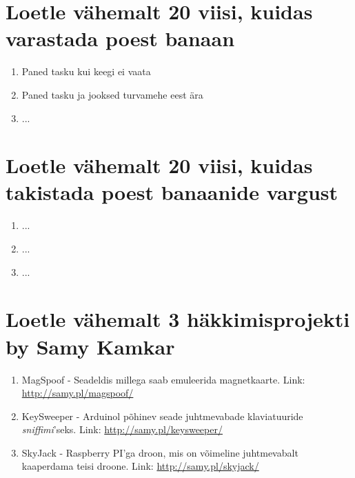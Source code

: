 \documentclass{article}
\begin{document}
\section{Loetle vähemalt 20 viisi, kuidas varastada poest banaan}
\begin{enumerate}
	\item{Paned tasku kui keegi ei vaata}
	\item{Paned tasku ja jooksed turvamehe eest ära}
	\item{...}
\end{enumerate}

\section{Loetle vähemalt 20 viisi, kuidas takistada poest banaanide vargust}
\begin{enumerate}
	\item{...}
	\item{...}
	\item{...}
\end{enumerate}

\section{Loetle vähemalt 3 häkkimisprojekti by Samy Kamkar}
\begin{enumerate}
	\item{MagSpoof - Seadeldis millega saab emuleerida magnetkaarte. Link: \url{http://samy.pl/magspoof/}}
	\item{KeySweeper - Arduinol põhinev seade juhtmevabade klaviatuuride \textit{sniffimi}'seks. Link: \url{http://samy.pl/keysweeper/}}
	\item{SkyJack - Raspberry PI'ga droon, mis on võimeline juhtmevabalt kaaperdama teisi droone. Link: \url{http://samy.pl/skyjack/}}
\end{enumerate}
\end{document}
